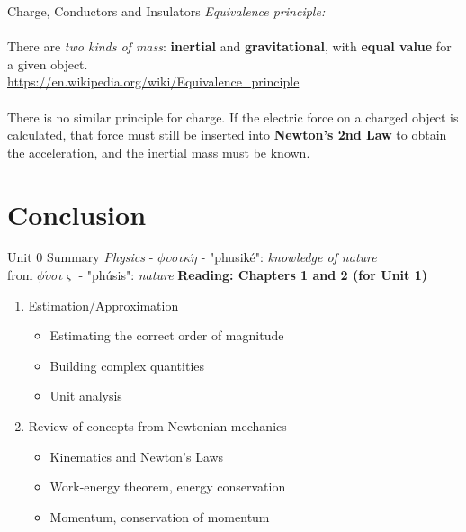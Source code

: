 \documentclass{beamer}
\begin{document}
\begin{frame}{Charge, Conductors and Insulators}
\small
\textit{Equivalence principle:} \\ \hrulefill \\
There are \textit{two kinds of mass}: \textbf{inertial} and \textbf{gravitational}, with \textbf{equal value} for a given object. \\ \vspace{0.5cm}
\url{https://en.wikipedia.org/wiki/Equivalence_principle} \\
\hrulefill \\
There is no similar principle for charge.  If the electric force on a charged object is calculated, that force must still be inserted into \textbf{Newton's 2nd Law} to obtain the acceleration, and the inertial mass must be known.
\end{frame}

\section{Conclusion}

\begin{frame}{Unit 0 Summary}
\textit{Physics} - $\phi\upsilon\sigma\iota\kappa\acute{\eta}$ - "phusik\'e": \textit{knowledge of nature} \\
from $\phi\acute{\upsilon}\sigma\iota\varsigma$ - "ph\'usis": \textit{nature}
\textbf{Reading: Chapters 1 and 2 (for Unit 1)}
\begin{enumerate}
\item Estimation/Approximation
\begin{itemize}
\item \alert{Estimating} the correct order of magnitude
\item \alert{Building} complex quantities
\item \alert{Unit analysis}
\end{itemize}
\item Review of concepts from Newtonian mechanics
\begin{itemize}
\item Kinematics and \alert{Newton's Laws}
\item Work-energy theorem, energy conservation
\item Momentum, conservation of momentum
\end{itemize}
\end{enumerate}
\end{frame}
\end{document}
